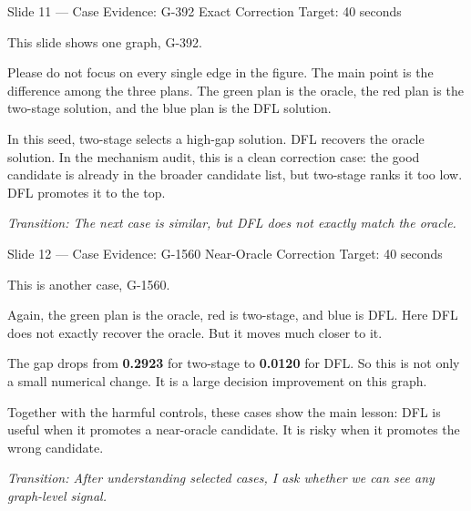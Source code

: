 \documentclass[11pt,aspectratio=169]{beamer}
\newcommand{\kw}[1]{\textcolor{navyblue}{\textbf{#1}}}
\newcommand{\tr}[1]{\vspace{0.35em}\textit{\textcolor{black!55}{Transition: #1}}}
\newcommand{\timing}[1]{\textcolor{black!45}{\scriptsize Target: #1}\par\vspace{0.25em}}
\begin{document}
\begin{frame}{Slide 11 \enspace\textmd{\small\textcolor{black!40}{--- Case Evidence: G-392 Exact Correction}}}
\small
\timing{40 seconds}

This slide shows one graph, G-392.

\vspace{0.35em}
Please do not focus on every single edge in the figure. The main point is the difference among the three plans. The green plan is the oracle, the red plan is the two-stage solution, and the blue plan is the DFL solution.

\vspace{0.35em}
In this seed, two-stage selects a high-gap solution. DFL recovers the oracle solution. In the mechanism audit, this is a clean correction case: the good candidate is already in the broader candidate list, but two-stage ranks it too low. DFL promotes it to the top.

\tr{The next case is similar, but DFL does not exactly match the oracle.}
\end{frame}

\begin{frame}{Slide 12 \enspace\textmd{\small\textcolor{black!40}{--- Case Evidence: G-1560 Near-Oracle Correction}}}
\small
\timing{40 seconds}

This is another case, G-1560.

\vspace{0.35em}
Again, the green plan is the oracle, red is two-stage, and blue is DFL. Here DFL does not exactly recover the oracle. But it moves much closer to it.

\vspace{0.35em}
The gap drops from \kw{0.2923} for two-stage to \kw{0.0120} for DFL. So this is not only a small numerical change. It is a large decision improvement on this graph.

\vspace{0.35em}
Together with the harmful controls, these cases show the main lesson: DFL is useful when it promotes a near-oracle candidate. It is risky when it promotes the wrong candidate.

\tr{After understanding selected cases, I ask whether we can see any graph-level signal.}
\end{frame}
\end{document}
